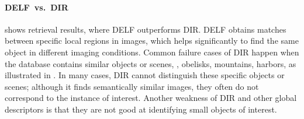 \documentclass[10pt,twocolumn,letterpaper]{article}
\begin{document}
\paragraph{DELF~vs.~DIR}
 shows retrieval results, where DELF outperforms DIR.
DELF obtains matches between specific local regions in images, which helps significantly to find the same object in different imaging conditions.
Common failure cases of DIR happen when the database contains similar objects or scenes, \eg, obelisks, mountains, harbors, as illustrated in .
In many cases, DIR cannot distinguish these specific objects or scenes; although it finds semantically similar images, they often do not correspond to the instance of interest.
Another weakness of DIR and other global descriptors is that they are not good at identifying small objects of interest.
\end{document}
